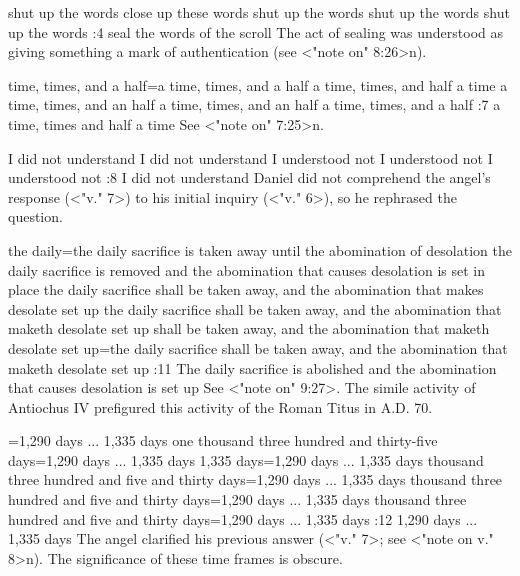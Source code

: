     {shut up the words} %
    {close up these words} %
    {shut up the words} %
    {shut up the words} %
    {shut up the words} %
:4 {seal the words of the scroll} The act of sealing was understood as giving something a mark of
authentication (see <"note on"  8:26>n).

    {time, times, and a half}={a time, times, and a half} %
    {a time, times, and half a time} %
    {a time, times, and an half} %
    {a time, times, and an half} %
    {a time, times, and a half} %
:7 {a time, times and half a time} See <"note on" 7:25>n.

    {I did not understand} %
    {I did not understand} %
    {I understood not} %
    {I understood not} %
    {I understood not} %
:8 {I did not understand} Daniel did not comprehend the angel's response (<"v." 7>) to his initial inquiry (<"v." 6>), so he rephrased the  question.

    {the daily}={the daily sacrifice is taken away until the abomination of desolation} %
    {the daily sacrifice is removed and the abomination that causes desolation is set in place} %
    {the daily sacrifice shall be taken away, and the abomination that makes desolate set up} %
    {the daily sacrifice shall be taken away, and the abomination that maketh desolate set up} %
    {shall be taken away, and the abomination that maketh desolate set up}={the daily sacrifice shall be taken away, and the abomination that maketh desolate set up} %
:11 {The daily sacrifice is abolished and the abomination that causes desolation is set up} 
See <"note on" 9:27>. The simile activity of Antiochus IV prefigured this activity of the Roman Titus  in A.D. 70. 

={1,290 days ... 1,335 days}  %
    {one thousand three hundred and thirty-five days}={1,290 days ... 1,335 days}  %
    {1,335 days}={1,290 days ... 1,335 days}  %
    {thousand three hundred and five and thirty days}={1,290 days ... 1,335 days}  %
    {thousand three hundred and five and thirty days}={1,290 days ... 1,335 days}  %
    {thousand three hundred and five and thirty days}={1,290 days ... 1,335 days} %
:12 {1,290 days ... 1,335 days} The angel clarified his previous answer (<"v." 7>; see <"note on
v." 8>n). The significance of these time  frames is obscure.




